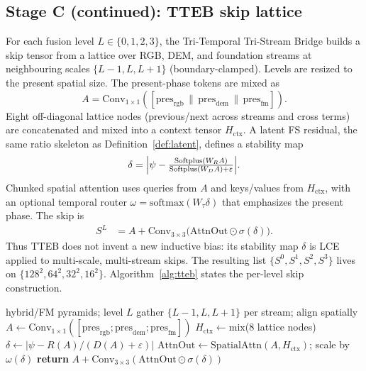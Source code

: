 \subsection{Stage C (continued): TTEB skip lattice}
\label{sec:tteb}
For each fusion level \(L\in\{0,1,2,3\}\), the Tri-Temporal Tri-Stream Bridge builds a skip tensor from a lattice over RGB, DEM, and foundation streams at neighbouring scales \(\{L-1,L,L+1\}\) (boundary-clamped). Levels are resized to the present spatial size. The present-phase tokens are mixed as
\begin{equation}
\label{eq:tteb-a}
A=\mathrm{Conv}_{1\times1}
([\mathrm{pres}_{\mathrm{rgb}}\,\|\,
\mathrm{pres}_{\mathrm{dem}}\,\|\,
\mathrm{pres}_{\mathrm{fm}}]).
\end{equation}
Eight off-diagonal lattice nodes (previous/next across streams and cross terms) are concatenated and mixed into a context tensor \(H_{\mathrm{ctx}}\). A latent FS residual, the same ratio skeleton as Definition~\ref{def:latent}, defines a stability map
\begin{equation}
\label{eq:tteb-delta}
\delta
=
\Bigl|
\psi
-
\tfrac{\mathrm{Softplus}(W_R A)}
{\mathrm{Softplus}(W_D A)+\varepsilon}
\Bigr|.
\end{equation}
Chunked spatial attention uses queries from \(A\) and keys/values from \(H_{\mathrm{ctx}}\), with an optional temporal router
\(\omega=\mathrm{softmax}(W_\tau\delta)\)
that emphasizes the present phase. The skip is
\begin{equation}
\label{eq:tteb-out}
\begin{split}
S^{L}
&=
A
+
\mathrm{Conv}_{3\times3}\!\bigl(
\mathrm{AttnOut}\odot\sigma(\delta)
\bigr).
\end{split}
\end{equation}
Thus TTEB does not invent a new inductive bias: its stability map \(\delta\) is LCE applied to multi-scale, multi-stream skips. The resulting list \(\{S^{0},S^{1},S^{2},S^{3}\}\) lives on \(\{128^{2},64^{2},32^{2},16^{2}\}\). Algorithm~\ref{alg:tteb} states the per-level skip construction.

\begin{algorithm}[htbp]
\caption{TTEB at level \(L\)}
\label{alg:tteb}
\begin{algorithmic}
\Require hybrid/FM pyramids; level \(L\)
\State gather \(\{L{-}1,L,L{+}1\}\) per stream; align spatially
\State \(A\leftarrow\mathrm{Conv}_{1\times1}([\mathrm{pres}_{\mathrm{rgb}};\mathrm{pres}_{\mathrm{dem}};\mathrm{pres}_{\mathrm{fm}}])\)
\State \(H_{\mathrm{ctx}}\leftarrow\mathrm{mix}\)(8 lattice nodes)
\State \(\delta\leftarrow|\psi-R(A)/(D(A)+\varepsilon)|\)
\State \(\mathrm{AttnOut}\leftarrow\mathrm{SpatialAttn}(A,H_{\mathrm{ctx}})\); scale by \(\omega(\delta)\)
\State \textbf{return} \(A+\mathrm{Conv}_{3\times3}(\mathrm{AttnOut}\odot\sigma(\delta))\)
\end{algorithmic}
\end{algorithm}


